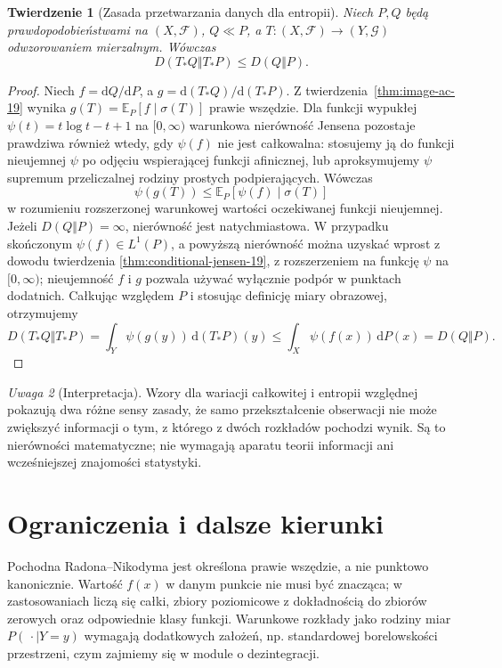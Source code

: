 \documentclass[11pt,a4paper,oneside]{book}
\numberwithin{equation}{chapter}
\theoremstyle{plain}
\newtheorem{twierdzenie}{Twierdzenie}[chapter]
\theoremstyle{definition}
\theoremstyle{remark}
\newtheorem{uwaga}[twierdzenie]{Uwaga}
\begin{document}
\begin{twierdzenie}[Zasada przetwarzania danych dla entropii]
\label{thm:kl-data-processing-19}
Niech $P,Q$ będą prawdopodobieństwami na $(X,\mathcal F)$,
$Q\ll P$, a $T:(X,\mathcal F)\to(Y,\mathcal G)$
odwzorowaniem mierzalnym. Wówczas
\[
 D(T_*Q\Vert T_*P)\le D(Q\Vert P).
\]
\end{twierdzenie}
\begin{proof}
Niech $f=\mathrm dQ/\mathrm dP$, a
$g=\mathrm d(T_*Q)/\mathrm d(T_*P)$.
Z twierdzenia~\ref{thm:image-ac-19} wynika
$g(T)=\mathbb E_P[f\mid\sigma(T)]$ prawie wszędzie.
Dla funkcji wypukłej
$\psi(t)=t\log t-t+1$ na $[0,\infty)$
warunkowa nierówność Jensena pozostaje prawdziwa
również wtedy, gdy $\psi(f)$ nie jest całkowalna:
stosujemy ją do funkcji nieujemnej $\psi$ po odjęciu
wspierającej funkcji afinicznej, lub aproksymujemy
$\psi$ supremum przeliczalnej rodziny prostych
podpierających. Wówczas
\[
 \psi(g(T))\le\mathbb E_P[\psi(f)\mid\sigma(T)]
\]
w rozumieniu rozszerzonej warunkowej wartości oczekiwanej
funkcji nieujemnej. Jeżeli $D(Q\Vert P)=\infty$,
nierówność jest natychmiastowa. W przypadku skończonym
$\psi(f)\in L^1(P)$, a powyższą nierówność można
uzyskać wprost z dowodu twierdzenia
\ref{thm:conditional-jensen-19}, z rozszerzeniem na funkcję
$\psi$ na $[0,\infty)$; nieujemność $f$ i $g$
pozwala używać wyłącznie podpór w punktach dodatnich.
Całkując względem $P$ i stosując definicję miary obrazowej,
otrzymujemy
\[
 D(T_*Q\Vert T_*P)
=\int_Y\psi(g(y))\,\mathrm d(T_*P)(y)
\le\int_X\psi(f(x))\,\mathrm dP(x)=D(Q\Vert P).
\]
\end{proof}

\begin{uwaga}[Interpretacja]
Wzory dla wariacji całkowitej i entropii względnej
pokazują dwa różne sensy zasady, że samo przekształcenie
obserwacji nie może zwiększyć informacji o tym,
z którego z dwóch rozkładów pochodzi wynik. Są to
nierówności matematyczne; nie wymagają aparatu teorii
informacji ani wcześniejszej znajomości statystyki.
\end{uwaga}

\section{Ograniczenia i dalsze kierunki}
Pochodna Radona--Nikodyma jest określona prawie wszędzie,
a nie punktowo kanonicznie. Wartość $f(x)$ w danym punkcie
nie musi być znacząca; w zastosowaniach liczą się całki,
zbiory poziomicowe z dokładnością do zbiorów zerowych
oraz odpowiednie klasy funkcji. Warunkowe rozkłady
jako rodziny miar $P(\,\cdot\mid Y=y)$ wymagają dodatkowych
założeń, np. standardowej borelowskości przestrzeni,
czym zajmiemy się w module o dezintegracji.
\end{document}
